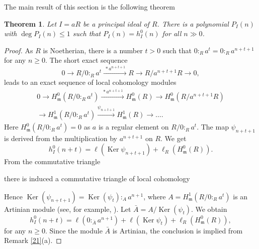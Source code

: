 \documentclass{amsart}
\newtheorem{theorem}{Theorem}[section]
\theoremstyle {definition}
\theoremstyle {remark}
\begin{document}
The main result of this section is the following theorem

\begin{theorem}\label{22}
Let $I=aR$ be a principal ideal of $R$. There is a polynomial $P_I(n)$ with $\deg P_I(n)\leq 1$ such that $P_I(n)=h^0_I(n)$ for all $n\gg 0$.
\end{theorem}
\begin{proof}
As $R$ is Noetherian, there is a number $t>0$ such that $0:_Ra^t=0:_Ra^{n+t+1}$ for any $n\geq 0$. The short exact sequence
$$0\longrightarrow R/0:_Ra^t\xrightarrow{\ *a^{n+t+1}\ } R\longrightarrow R/a^{n+t+1}R\longrightarrow 0,$$
leads to an exact sequence of local cohomology modules
\begin{multline*}
0\longrightarrow H^0_{\ensuremath{\mathfrak m}}(R/0:_Ra^t)\xrightarrow{\ *a^{n+t+1}\ } H^0_{\ensuremath{\mathfrak m}}(R)\longrightarrow H^0_{\ensuremath{\mathfrak m}}(R/a^{n+t+1}R)\\
\longrightarrow H^1_{\ensuremath{\mathfrak m}}(R/0:_Ra^t)\xrightarrow{\psi_{n+t+1}} H^1_{\ensuremath{\mathfrak m}}(R)\longrightarrow \ldots.
\end{multline*}
Here $H^0_{\ensuremath{\mathfrak m}}(R/0:_Ra^t)=0$ as $a$ is a regular element on $R/0:_Ra^t$. The map $\psi_{n+t+1}$ is derived from the multiplication by $a^{n+t+1}$ on $R$. We  get
$$h^0_I(n+t)=\ell({\operatorname{Ker}} \psi_{n+t+1})+\ell_R(H^0_{\ensuremath{\mathfrak m}}(R)).$$
From the commutative triangle\medskip

\centerline{
}
\bigskip

\noindent there is induced a commutative triangle of local cohomology\medskip

\centerline{
}
\bigskip

\noindent Hence ${\operatorname{Ker}}(\psi_{n+t+1})={\operatorname{Ker}}(\psi_t):_Aa^{n+1}$, where $A=H^1_{\ensuremath{\mathfrak m}}(R/0:_Ra^t)$ is an Artinian module (see, for example, \cite[Theorem 7.1.3]{BS}). Let $\bar A=A/{\operatorname{Ker}}(\psi_t)$. We obtain
$$h^0_I(n+t)=\ell(0:_{\bar A}a^{n+1})+\ell({\operatorname{Ker}} \psi_t)+\ell_R(H^0_{\ensuremath{\mathfrak m}}(R)),$$
for any $n\geq 0$. Since the module $\bar A$ is Artinian, the conclusion is implied from Remark \ref{21}(a).
\end{proof}
\end{document}
